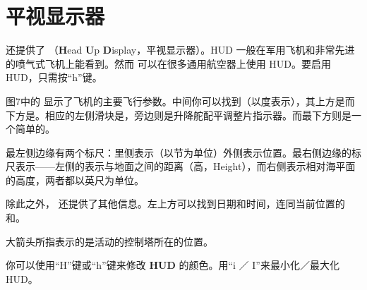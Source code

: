 \ifchinese
\section{平视显示器}
\fi

{}

\ifchinese
\FlightGear{} 还提供了 （\textbf{H}ead \textbf{U}p
\textbf{D}isplay，平视显示器）。HUD 一般在军用飞机和非常先进的喷气式飞机上能看到。然而 \FlightGear{} 可以在很多通用航空器上使用 HUD。要启用 HUD，只需按“h”键。

图7中的  显示了飞机的主要飞行参数。中间你可以找到（以度表示），其上方是而下方是。相应的左侧滑块是，旁边则是升降舵配平调整片指示器。而最下方则是一个简单的。

最左侧边缘有两个标尺：里侧表示（以节为单位）外侧表示位置。最右侧边缘的标尺表示——左侧的表示与地面之间的距离（高，Height），而右侧表示相对海平面的高度，两者都以英尺为单位。

除此之外， 还提供了其他信息。左上方可以找到日期和时间，连同当前位置的和。

大箭头所指表示的是活动的控制塔所在的位置。

你可以使用“H”键或“h”键来修改 \textbf{HUD} 的颜色。用“i ／ I”来最小化／最大化 HUD。

